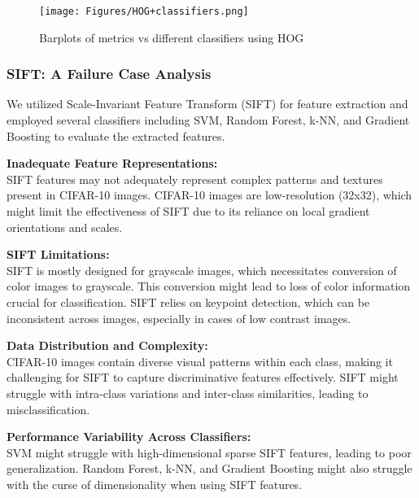 \documentclass[a4paper]{article}
\theoremstyle{plain}
\theoremstyle{definition}
\begin{document}
{\begin{figure}[H]
    \centering
    \texttt{[image: Figures/HOG+classifiers.png]}
    \caption{Barplots of metrics vs different classifiers using HOG}
    \label{fig:enter-label22}
\end{figure}

\subsubsection {SIFT: A Failure Case Analysis}

We utilized Scale-Invariant Feature Transform (SIFT) for feature extraction and employed several classifiers including SVM, Random Forest, k-NN, and Gradient Boosting to evaluate the extracted features.


\noindent
\textbf{Inadequate Feature Representations:} \\
SIFT features may not adequately represent complex patterns and textures present in CIFAR-10 images. CIFAR-10 images are low-resolution (32x32), which might limit the effectiveness of SIFT due to its reliance on local gradient orientations and scales.\newline

\noindent \textbf{SIFT Limitations:} \\
SIFT is mostly designed for grayscale images, which necessitates conversion of color images to grayscale. This conversion might lead to loss of color information crucial for classification. SIFT relies on keypoint detection, which can be inconsistent across images, especially in cases of low contrast images.\newline

\noindent \textbf{Data Distribution and Complexity:} \\
CIFAR-10 images contain diverse visual patterns within each class, making it challenging for SIFT to capture discriminative features effectively. SIFT might struggle with intra-class variations and inter-class similarities, leading to misclassification.\newline

\noindent\textbf{Performance Variability Across Classifiers:} \\
SVM might struggle with high-dimensional sparse SIFT features, leading to poor generalization. Random Forest, k-NN, and Gradient Boosting might also struggle with the curse of dimensionality when using SIFT features.\newline



}
\end{document}
